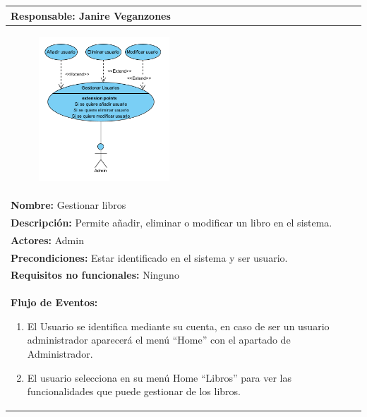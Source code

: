 \documentclass{report}
\begin{document}
                \begin{center}
                    \begin{longtable}{|p{\linewidth}|}
                        \hline
                        \textbf{Responsable:} Janire Veganzones\\
                        \hline
                        \begin{figure}[H]
                            \centering
                            \includegraphics[width=0.45\textwidth]{./img/casos_uso/CasoDeUsoGestionUsu.png}
                        \end{figure}\\
                        \hline
                        \textbf{Nombre:} Gestionar libros\\
                        \hline
                        \textbf{Descripción:}  Permite añadir, eliminar o modificar un libro en el sistema.\\
                        \hline
                        \textbf{Actores:} Admin\\
                        \hline
                        \textbf{Precondiciones:} Estar identificado en el sistema y ser usuario.\\
                        \hline
                        \textbf{Requisitos no funcionales:} Ninguno\\
                        \hline
                        \textbf{Flujo de Eventos:}
                        \begin{enumerate}
                            \item El Usuario se identifica mediante su cuenta, en caso de ser un usuario administrador aparecerá el menú “Home” con el apartado de Administrador.
                            \item El usuario selecciona en su menú Home “Libros” para ver las funcionalidades que puede gestionar de los libros.

\end{enumerate}
\end{longtable}
\end{center}
\end{document}
